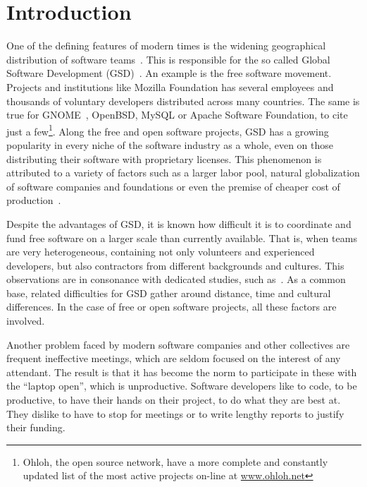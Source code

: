 \documentclass[letterpaper]{article}
\newcommand{\indraftnote}[1]{\textcolor{blue}{\texttt{\footnotesize[#1]}}}
\newcommand{\todo}[1]{\indraftnote{todo: #1}}
\begin{document}


\section{Introduction}

One of the defining features of modern times is the widening geographical
distribution of software teams~\cite{last2003}. This is responsible for the so
called Global Software Development (GSD)~\cite{german2003}.  An example is the
free software movement. Projects and institutions like Mozilla Foundation has
several employees and thousands of voluntary developers distributed across many
countries. The same is true for GNOME~\cite{german2003}, OpenBSD, MySQL or
Apache Software Foundation, to cite just a few\footnote{Ohloh, the open source
  network, have a more complete and constantly updated list of the most active
  projects on-line at \url{www.ohloh.net}}. Along the free and open software
projects, GSD has a growing popularity in every niche of the software industry
as a whole, even on those distributing their software with proprietary
licenses. This phenomenon is attributed to a variety of factors such as a larger
labor pool, natural globalization of software companies and foundations or even
the premise of cheaper cost of production~\cite{komi2005}.

Despite the advantages of GSD, it is known how difficult it is to coordinate and
fund free software on a larger scale than currently available. That is, when
teams are very heterogeneous, containing not only volunteers and experienced
developers, but also contractors from different backgrounds and cultures. This
observations are in consonance with dedicated studies, such
as~\cite{carmel1999}.  As a common base, related difficulties for GSD gather
around distance, time and cultural differences. In the case of free or open
software projects, all these factors are involved.

Another problem faced by modern software companies and other collectives are
frequent ineffective meetings, which are seldom focused on the interest of any
attendant. The result is that it has become the norm to participate in these
with the ``laptop open'', which is unproductive. Software developers like to
code, to be productive, to have their hands on their project, to do what they
are best at. They dislike to have to stop for meetings or to write lengthy
reports to justify their funding.
\end{document}
